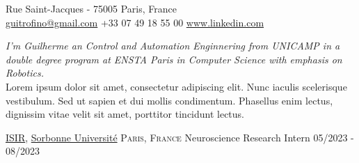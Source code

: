 \documentclass[10pt, a4paper]{article}
\begin{document}
 



 Rue Saint-Jacques - 75005 Paris, France\\         %
\href{mailto:guitrofino@gmail.com}{guitrofino@gmail.com}\bull   %
+33 07 49 18 55 00\bull                                         %
\href{https://www.linkedin.com/in/guilherme-trofino/}{www.linkedin.com} %

\spacedhrule{0.9em}{-0.4em}


\vspace{-1.3em}

\begin{multicols}{2}
\noindent \textit{I'm Guilherme an Control and Automation Enginnering from UNICAMP in a double degree program at ENSTA Paris in Computer Science with emphasis on Robotics.}\\

\noindent Lorem ipsum dolor sit amet, consectetur adipiscing elit. Nunc iaculis scelerisque vestibulum. Sed ut sapien et dui mollis condimentum. Phasellus enim lectus, dignissim vitae velit sit amet, porttitor tincidunt lectus.
\end{multicols}

\spacedhrule{0.5em}{-0.4em}



\headedsection
    {\href{}{ISIR}, \href{}{Sorbonne Université}}
    {\textsc{Paris, France}}
    {
        \headedsubsection
        {Neuroscience Research Intern}
        {05/2023 - 08/2023}
        {}
    }
\end{document}
